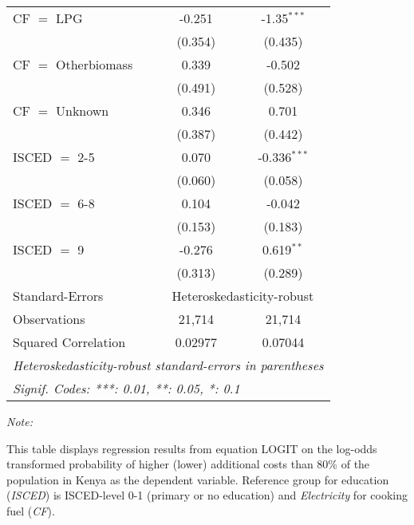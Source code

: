\begin{table}[htbp!]
\begin{adjustbox}{width = 1\textwidth, max height = 0.95\textheight, center}
\begin{threeparttable}[b]
\begin{tabular}{lcc}
            CF $=$ LPG           & -0.251         & -1.35$^{***}$\\   
                                 & (0.354)        & (0.435)\\   
            CF $=$ Otherbiomass  & 0.339          & -0.502\\   
                                 & (0.491)        & (0.528)\\   
            CF $=$ Unknown       & 0.346          & 0.701\\   
                                 & (0.387)        & (0.442)\\   
            ISCED $=$ 2-5        & 0.070          & -0.336$^{***}$\\   
                                 & (0.060)        & (0.058)\\   
            ISCED $=$ 6-8        & 0.104          & -0.042\\   
                                 & (0.153)        & (0.183)\\   
            ISCED $=$ 9          & -0.276         & 0.619$^{**}$\\   
                                 & (0.313)        & (0.289)\\   
            \midrule 
            Standard-Errors & \multicolumn{2}{c}{Heteroskedasticity-robust} \\ 
            Observations         & 21,714         & 21,714\\  
            Squared Correlation  & 0.02977        & 0.07044\\  
            \midrule \midrule
            \multicolumn{3}{l}{\emph{Heteroskedasticity-robust standard-errors in parentheses}}\\
            \multicolumn{3}{l}{\emph{Signif. Codes: ***: 0.01, **: 0.05, *: 0.1}}\\
         \end{tabular}
         
         \begin{tablenotes}\item \medskip \textit{Note:}
            \item This table displays regression results from equation LOGIT on the log-odds transformed probability of higher (lower) additional costs than 80\% of the population in Kenya as the dependent variable. Reference group for education (\textit{ISCED}) is ISCED-level 0-1 (primary or no education) and \textit{Electricity} for cooking fuel (\textit{CF}).
         \end{tablenotes}
      \end{threeparttable}
   \end{adjustbox}
\end{table}



